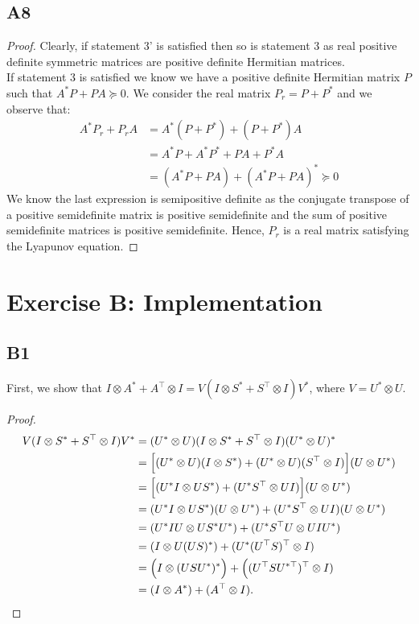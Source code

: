 \documentclass[11pt]{article}
\newcommand{\kp}{\otimes}
\begin{document}
\subsection*{A8}
\begin{proof}\leavevmode
Clearly, if statement 3' is satisfied then so is statement 3 as real positive definite symmetric matrices are positive definite Hermitian matrices.\\
If statement 3 is satisfied we know we have a positive definite Hermitian matrix $P$ such that $A^*P+PA\succeq 0$. We consider the real matrix $P_r=P+P^*$ and we observe that:
\begin{align*}
    A^* P_r+P_r A &= A^*(P+P^*)+(P+P^*)A\\
    &= A^*P+A^*P^*+PA+P^*A\\
    &= (A^*P+PA)+(A^*P+PA)^* \succeq 0
\end{align*}
We know the last expression is semipositive definite as the conjugate transpose of a positive semidefinite matrix is positive semidefinite and the sum of positive semidefinite matrices is positive semidefinite. Hence, $P_r$ is a real matrix satisfying the Lyapunov equation.
\end{proof}

\section*{Exercise B: Implementation}
\subsection*{B1}
First, we show that $I \kp A^{*} + A^\top \kp I = V (I \kp S^{*} + S^\top \kp I) V^{*}$, where \(V = U^* \kp U\).

\begin{proof}
\begin{align*}
   V (I \kp S^{*} + S^\top \kp I) V^{*}
   &= (U^{*} \kp U) (I \kp S^{*} + S^\top \kp I) (U^{*} \kp U)^{*} \\
   &= \Big[(U^{*} \kp U) (I \kp S^{*}) + (U^{*} \kp U) (S^\top \kp I)\Big] (U \kp U^{*}) \\
   &= \Big[(U^{*} I \kp U S^{*}) + (U^{*}S^\top \kp U I)\Big] (U \kp U^{*}) \\
   &= (U^{*} I \kp U S^{*}) (U \kp U^{*}) + (U^{*}S^\top \kp U I) (U \kp U^{*}) \\
   &= (U^{*} I U \kp U S^{*} U^{*}) + (U^{*}S^\top U \kp U I U^{*}) \\
   &= (I \kp U (U S)^{*} ) + (U^{*} (U^\top S)^\top \kp I) \\
   &= \Big(I \kp (U S U^{*})^{*}\Big) + \Big((U^\top S U^{*\top})^\top \kp I) \\
   &= (I \kp A^{*} ) + (A^\top \kp I).\qedhere
\end{align*}
\end{proof}
\end{document}
